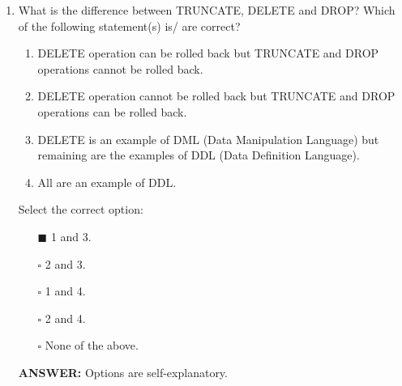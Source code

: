 \documentclass[10pt]{article}
\begin{document}
\begin{enumerate}
		\item What is the difference between TRUNCATE, DELETE and DROP? Which of the following statement(s) is/ are correct?
			\begin{enumerate}
				\item DELETE operation can be rolled back but TRUNCATE and DROP operations cannot be rolled back.
				\item DELETE operation cannot be rolled back but TRUNCATE and DROP operations can be rolled back.
				\item DELETE is an example of DML (Data Manipulation Language) but remaining are the examples of DDL (Data Definition Language).
				\item All are an example of DDL.
			\end{enumerate}
			Select the correct option:
			\begin{enumerate}
				\item[$\blacksquare$] 1 and 3.
				\item[$\square$] 2 and 3.
				\item[$\square$] 1 and 4.
				\item[$\square$] 2 and 4.
				\item[$\square$] None of the above.
			\end{enumerate}
			\color{red} \textbf{ANSWER:} \color{black} Options are self-explanatory.

		\newpage


\end{enumerate}
\end{document}

